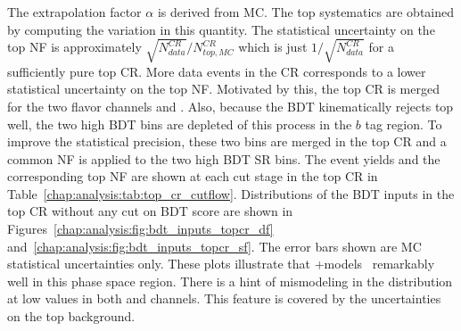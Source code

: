 \noindent The extrapolation factor $\alpha$ is derived from
MC. The top systematics are obtained by computing the variation in
this quantity. The statistical uncertainty on the top NF is
approximately $\sqrt{N_{data}^{CR}}/N_{top,MC}^{CR}$ which is just
$1/\sqrt{N_{data}^{CR}}$ for a sufficiently pure top CR. More data
events in the CR corresponds to a lower statistical uncertainty on the
top NF. Motivated by this, the top CR is merged for the two flavor
channels \eemm and \emme. Also, because the BDT kinematically rejects
top well, the two high BDT bins are depleted of this process in
the $b$ tag region. To improve the statistical precision, these two
bins are merged in the top CR and a common NF is applied to the two
high BDT SR bins. The event yields and the corresponding top NF are
shown at each cut stage in the top CR in
Table~\ref{chap:analysis:tab:top_cr_cutflow}. Distributions of the BDT
inputs in the top CR without any cut on BDT score are shown in
Figures~\ref{chap:analysis:fig:bdt_inputs_topcr_df}
and~\ref{chap:analysis:fig:bdt_inputs_topcr_sf}. The error bars shown
are MC statistical uncertainties only. These plots illustrate
that \POWHEG+\PYTHIA models \ttbar~remarkably well in this phase space
region. There is a hint of mismodeling in the \dphill distribution at
low values in both \emme and \eemm channels. This feature is covered
by the uncertainties on the top background. 

